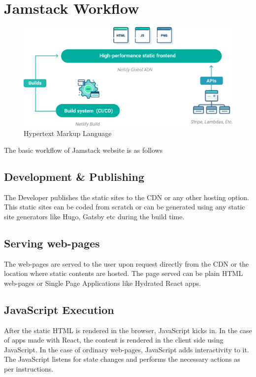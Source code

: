 \documentclass[12pt,a4paper,oneside]{report}
\begin{document}
\section{Jamstack Workflow}
\begin{figure}[H]
    \centering
    \includegraphics[scale=.3]{images/how-it-works.png}
    \caption{Hypertext Markup Language\cite{wjam}}
\end{figure}
\par 
The basic workflow of Jamstack website is as follows
\subsection{Development \& Publishing}
\par
The Developer publishes the static sites to the CDN or any other hosting option. This static sites can be coded from scratch or can be generated using any static site generators like Hugo, Gatsby etc during the build time.
\subsection{Serving web-pages}
\par 
The web-pages are served to the user upon request directly from the CDN or the location where static contents are hosted. The page served can be plain HTML web-pages or Single Page Applications like Hydrated React apps.
\subsection{JavaScript Execution}
\par 
After the static HTML is rendered in the browser, JavaScript kicks in. In the case of apps made with React, the content is rendered in the client side using JavaScript. In the case of ordinary web-pages, JavaScript adds interactivity to it. The JavaScript listens for state changes and performs the necessary actions as per instructions.
\end{document}
